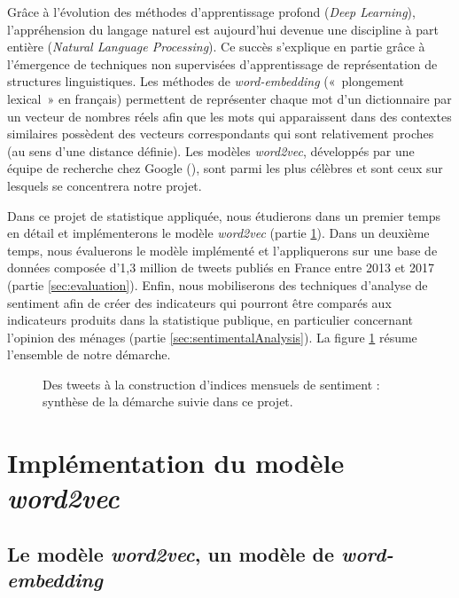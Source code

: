 \documentclass[11pt,french,french]{article}
\begin{document}
Grâce à l'évolution des méthodes d'apprentissage profond (\emph{Deep
Learning}), l'appréhension du langage naturel est aujourd'hui devenue
une discipline à part entière (\emph{Natural Language Processing}). Ce
succès s'explique en partie grâce à l'émergence de techniques non
supervisées d'apprentissage de représentation de structures
linguistiques. Les méthodes de \emph{word-embedding} («~plongement
lexical~» en français) permettent de représenter chaque mot d'un
dictionnaire par un vecteur de nombres réels afin que les mots qui
apparaissent dans des contextes similaires possèdent des vecteurs
correspondants qui sont relativement proches (au sens d'une distance
définie). Les modèles \emph{word2vec}, développés par une équipe de
recherche chez Google (\cite{Mikolov}), sont parmi les plus célèbres et
sont ceux sur lesquels se concentrera notre projet.

Dans ce projet de statistique appliquée, nous étudierons dans un premier
temps en détail et implémenterons le modèle \emph{word2vec} (partie
\ref{sec:word2vec}). Dans un deuxième temps, nous évaluerons le modèle
implémenté et l'appliquerons sur une base de données composée d'1,3
million de tweets publiés en France entre 2013 et 2017 (partie
\ref{sec:evaluation}). Enfin, nous mobiliserons des techniques d'analyse
de sentiment afin de créer des indicateurs qui pourront être comparés
aux indicateurs produits dans la statistique publique, en particulier
concernant l'opinion des ménages (partie \ref{sec:sentimentalAnalysis}).
La figure \ref{fig:schemaRecap} résume l'ensemble de notre démarche.

\vfill

\begin{figure}[!htb]

\captionsetup{margin=0cm,format=hang,justification=justified}
\caption{Des tweets à la construction d'indices mensuels de sentiment : synthèse de la démarche suivie dans ce projet.}\label{fig:schemaRecap}
\end{figure}

\newpage

\section{\texorpdfstring{Implémentation du modèle
\emph{word2vec}}{Implémentation du modèle word2vec}}\label{sec:word2vec}

\subsection{\texorpdfstring{Le modèle \emph{word2vec}, un modèle de
\emph{word-embedding}}{Le modèle word2vec, un modèle de word-embedding}}\label{le-moduxe8le-word2vec-un-moduxe8le-de-word-embedding}
\end{document}
